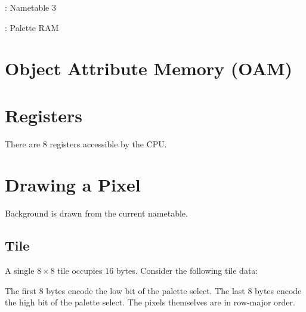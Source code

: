 : Nametable 3

: Palette RAM

\section{Object Attribute Memory (OAM)}

\section{Registers}

There are 8 registers accessible by the CPU.

\section{Drawing a Pixel}

Background is drawn from the current nametable.

\subsection{Tile}

A single $8 \times 8$ tile occupies $16$ bytes.
Consider the following tile data:





The first 8 bytes encode the low bit of the palette select.
The last 8 bytes encode the high bit of the palette select.
The pixels themselves are in row-major order.


